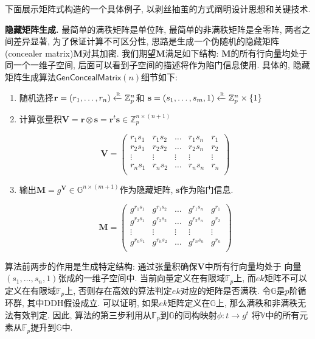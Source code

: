 下面展示矩阵式构造的一个具体例子, 以剥丝抽茧的方式阐明设计思想和关键技术.

\begin{trivlist}
\item \textbf{隐藏矩阵生成.} 最简单的满秩矩阵是单位阵, 最简单的非满秩矩阵是全零阵, 两者之间差异显著, 
	为了保证计算不可区分性, 思路是生成一个伪随机的隐藏矩阵(concealer matrix)$\mathbf{M}$对其加密. 
	我们期望$\mathbf{M}$满足如下结构: $\mathbf{M}$的所有行向量均处于同一个一维子空间, 
	后面可以看到子空间的描述将作为陷门信息使用. 
	具体的, 隐藏矩阵生成算法$\mathsf{GenConcealMatrix}(n)$细节如下: 
\begin{enumerate}
\item 随机选择$\mathbf{r} = (r_1, \dots, r_n) \xleftarrow{\textup{\tiny R}} \mathbb{Z}_p^n$和
	$\mathbf{s} = (s_1, \dots, s_m, 1) \xleftarrow{\textup{\tiny R}} \mathbb{Z}_p^n \times \{1\}$ 

\item 计算张量积$\mathbf{V} = \mathbf{r} \otimes \mathbf{s} = 
	\mathbf{r}^t \mathbf{s} \in \mathbb{Z}_p^{n \times (n+1)}$

\begin{displaymath} 
\mathbf{V} = \left( \begin{array}{cccc|c}
r_1s_1 & r_1s_2 & \ldots & r_1s_n & r_1 \\
r_2s_1 & r_2s_2 & \ldots & r_2s_n & r_2\\
\vdots & \vdots & \vdots & \vdots & \vdots\\
r_ns_1 & r_ns_2 & \ldots & r_ns_n & r_n\\
\end{array} \right)
\end{displaymath}

\item 输出$\mathbf{M} = g^{\mathbf{V}} \in \mathbb{G}^{n \times (m+1)}$作为隐藏矩阵, 
	$\mathbf{s}$作为陷门信息. 

\begin{displaymath} 
\mathbf{M} = \left( \begin{array}{cccc|c}
g^{r_1s_1} & g^{r_1s_2} & \ldots & g^{r_1s_n} & g^{r_1} \\
g^{r_2s_1} & g^{r_2s_2} & \ldots & g^{r_2s_n} & g^{r_2}\\
\vdots & \vdots & \vdots & \vdots & \vdots\\
g^{r_ns_1} & g^{r_ns_2} & \ldots & g^{r_ns_n} & g^{r_n}\\
\end{array} \right)
\end{displaymath}

\end{enumerate}

\item 算法前两步的作用是生成特定结构: 通过张量积确保$\mathbf{V}$中所有行向量均处于
	向量$(s_1, \dots, s_n, 1)$张成的一维子空间中. 
	当前向量定义在有限域$\mathbb{F}_p$上, 而$ek$矩阵不可以定义在有限域$\mathbb{F}_p$上, 
	否则存在高效的算法判定$ek$对应的矩阵是否满秩. 令$\mathbb{G}$是$p$阶循环群, 其中DDH假设成立. 
	可以证明, 如果$ek$矩阵定义在$\mathbb{G}$上, 那么满秩和非满秩无法有效判定. 
	因此, 算法的第三步利用从$\mathbb{F}_p$到$\mathbb{G}$的同构映射$\phi: t \rightarrow g^t$
	将$\mathbb{V}$中的所有元素从$\mathbb{F}_p$提升到$\mathbb{G}$中.  
\end{trivlist} 


